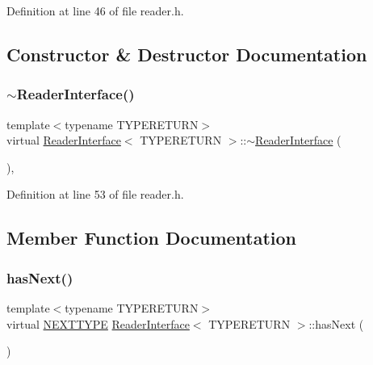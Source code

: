 Definition at line 46 of file reader.\+h.



\subsection{Constructor \& Destructor Documentation}
\mbox{\label{classReaderInterface_a76b0a42faf97cb747ca81f2fee307ef4}} 
\subsubsection{\texorpdfstring{$\sim$\+Reader\+Interface()}{~ReaderInterface()}}
{\footnotesize\ttfamily template$<$typename T\+Y\+P\+E\+R\+E\+T\+U\+RN$>$ \\
virtual \hyperlink{classReaderInterface}{Reader\+Interface}$<$ T\+Y\+P\+E\+R\+E\+T\+U\+RN $>$\+::$\sim$\hyperlink{classReaderInterface}{Reader\+Interface} (\begin{DoxyParamCaption}{ }\end{DoxyParamCaption})\hspace{0.3cm}{\ttfamily [inline]}, {\ttfamily [virtual]}}



Definition at line 53 of file reader.\+h.



\subsection{Member Function Documentation}
\mbox{\label{classReaderInterface_aeb39a897efaaeb0c4ada7fce47f06f83}} 
\subsubsection{\texorpdfstring{has\+Next()}{hasNext()}}
{\footnotesize\ttfamily template$<$typename T\+Y\+P\+E\+R\+E\+T\+U\+RN$>$ \\
virtual \hyperlink{classReaderInterface_ac2420ec8d2f60feadf2533d4fa77ec5e}{N\+E\+X\+T\+T\+Y\+PE} \hyperlink{classReaderInterface}{Reader\+Interface}$<$ T\+Y\+P\+E\+R\+E\+T\+U\+RN $>$\+::has\+Next (\begin{DoxyParamCaption}{ }\end{DoxyParamCaption})\hspace{0.3cm}{\ttfamily [pure virtual]}}

